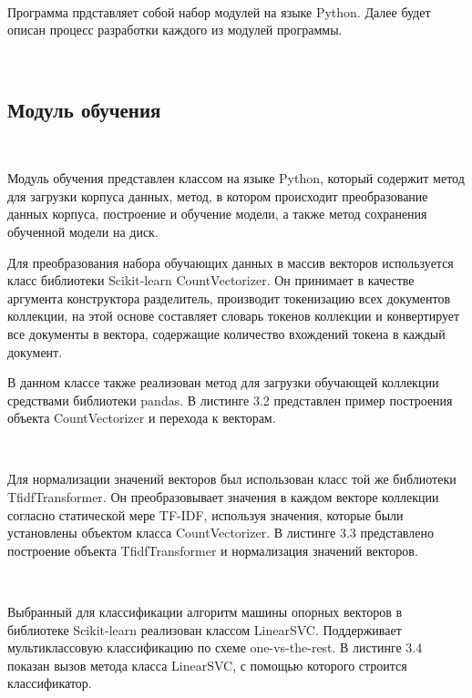 \

Программа прдставляет собой набор модулей на языке Python. Далее будет описан процесс разработки каждого из модулей программы.

\

\subsection{Модуль обучения}
\

Модуль обучения представлен классом на языке Python, который содержит метод для загрузки корпуса данных, метод, в котором происходит преобразование данных корпуса, построение и обучение модели, а также метод сохранения обученной модели на диск.

Для преобразования набора обучающих данных в массив векторов используется класс библиотеки Scikit-learn CountVectorizer. Он принимает в качестве аргумента конструктора разделитель, производит токенизацию всех документов коллекции, на этой основе составляет словарь токенов коллекции и конвертирует все документы в вектора, содержащие количество вхождений токена в каждый документ. 

В данном классе также реализован метод для загрузки обучающей коллекции средствами библиотеки pandas. В листинге 3.2 представлен пример построения объекта CountVectorizer и перехода к векторам.


\

Для нормализации значений векторов был использован класс той же библиотеки TfidfTransformer. Он преобразовывает значения в каждом векторе коллекции согласно статической мере TF-IDF, используя значения, которые были установлены объектом класса CountVectorizer. В листинге 3.3 представлено построение объекта TfidfTransformer и нормализация значений векторов.


\

Выбранный для классификации алгоритм машины опорных векторов в библиотеке Scikit-learn реализован классом LinearSVC\cite{Scikit}. Поддерживает мультиклассовую классификацию по схеме one-vs-the-rest. В листинге 3.4 показан вызов метода класса LinearSVC, с помощью которого строится классификатор.


\

